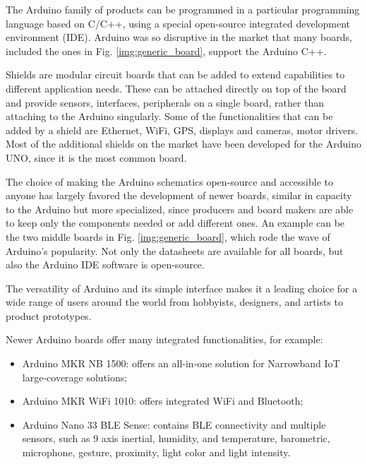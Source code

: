 		The Arduino family of products can be programmed in a particular programming language based on C/C++, using a special open-source integrated development environment (IDE).
		Arduino was so disruptive in the market that many boards, included the ones in Fig. \ref{img:generic_board}, support the Arduino C++.

		Shields are modular circuit boards that can be added to extend capabilities to different application needs.
		These can be attached directly on top of the board and provide sensors, interfaces, peripherals on a single board, rather than attaching to the Arduino singularly.
		Some of the functionalities that can be added by a shield are Ethernet, WiFi, GPS, displays and cameras, motor drivers.
		Most of the additional shields on the market have been developed for the Arduino UNO, since it is the most common board.
		
		The choice of making the Arduino schematics open-source and accessible to anyone has largely favored the development of newer boards, similar in capacity to the Arduino but more specialized, since producers and board makers are able to keep only the components needed or add different ones.
		An example can be the two middle boards in Fig. \ref{img:generic_board}, which rode the wave of Arduino's popularity.
		Not only the datasheets are available for all boards, but also the Arduino IDE software is open-source.
		
		The versatility of Arduino and its simple interface makes it a leading choice for a wide range of users around the world from hobbyists, designers, and artists to product prototypes. 
		
		Newer Arduino boards offer many integrated functionalities, for example:
		\begin{itemize}[noitemsep]
			\item Arduino MKR NB 1500: offers an all-in-one solution for Narrowband IoT large-coverage solutions;
			\item Arduino MKR WiFi 1010: offers integrated WiFi and Bluetooth;
			\item Arduino Nano 33 BLE Sense: contains BLE connectivity and multiple sensors, such as 9 axis inertial, humidity, and temperature, barometric, microphone, gesture, proximity, light color and light intensity.
		\end{itemize}
	

